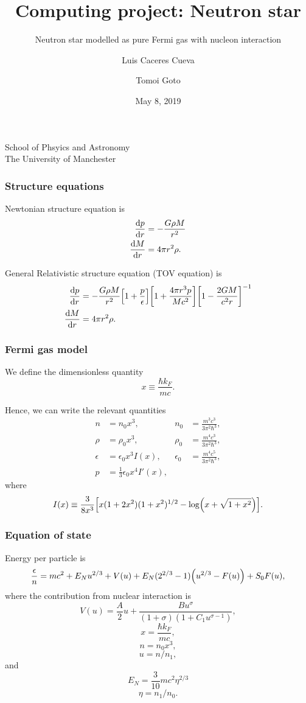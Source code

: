 \documentclass[hperref={pdfpagelabels=false}]{beamer}
\begin{document}
\title
{Computing project: Neutron star}

\subtitle{Neutron star modelled as pure Fermi gas with nucleon interaction}

\author
{Luis Caceres Cueva \and Tomoi Goto}

\institute
{
    School of Phsyics and Astronomy\\
    The University of Manchester
}
\date
{May 8, 2019}

\begin{frame}
 \titlepage
\end{frame}

\begin{frame}
 \frametitle{Structure equations}
 Newtonian structure equation is
 \begin{align*}
  \dv{p}{r}&=-\frac{G\rho M}{r^{2}}\\
  \dv{M}{r}&=4\pi r^{2}\rho.
 \end{align*}
 
General Relativistic structure equation (TOV equation) is
 \begin{align*}
  \dv{p}{r}&=-\frac{G\rho M}{r^{2}}\qty[1+\frac{p}{\epsilon}]\qty[1+\frac{4\pi r^{3}p}{Mc^{2}}]\qty[1-\frac{2GM}{c^{2}r}]^{-1}\\
  \dv{M}{r}&=4\pi r^{2}\rho.
 \end{align*}
\end{frame}

\begin{frame}
 \frametitle{Fermi gas model}
 We define the dimensionless quantity \[x\equiv\frac{\hbar k_{F}}{mc}.\]
 
 Hence, we can write the relevant quantities
 \begin{align*}
  n&=n_{0}x^{3},&n_{0}&=\frac{m^{3}c^{3}}{3\pi^{2}\hbar^{3}},\\
  \rho&=\rho_{0}x^{3},&\rho_{0}&=\frac{m^{4}c^{3}}{3\pi^{2}\hbar^{3}},\\
  \epsilon&=\epsilon_{0}x^{3}I(x),&\epsilon_{0}&=\frac{m^{4}c^{5}}{3\pi^{2}\hbar^{3}},\\
  p&=\frac{1}{3}\epsilon_{0}x^{4}I'(x),
 \end{align*}
 where \[I(x)\equiv \frac{3}{8x^{3}}\qty[x(1+2x^{2})(1+x^{2})^{1/2}-\log(x+\sqrt{1+x^{2}})].\]
\end{frame}


\begin{frame}
 \frametitle{Equation of state}
 Energy per particle is
\[\frac{\epsilon}{n}=mc^{2}+E_{N}u^{2/3}+V(u)+E_{N}(2^{2/3}-1)\qty(u^{2/3}-F(u))+S_{0}F(u),\]
 where the contribution from nuclear interaction is
 \[V(u)=\frac{A}{2}u+\frac{Bu^{\sigma}}{(1+\sigma)(1+C_{1}u^{\sigma-1})},\]
\[x=\frac{\hbar k_{F}}{mc},\]
 \[n=n_{0}x^{3},\]
 \[u=n/n_{1},\]
 and
 \[E_{N}=\frac{3}{10}mc^{2}\eta^{2/3}\]
 \[\eta=n_{1}/n_{0}.\]
\end{frame}
\end{document}
